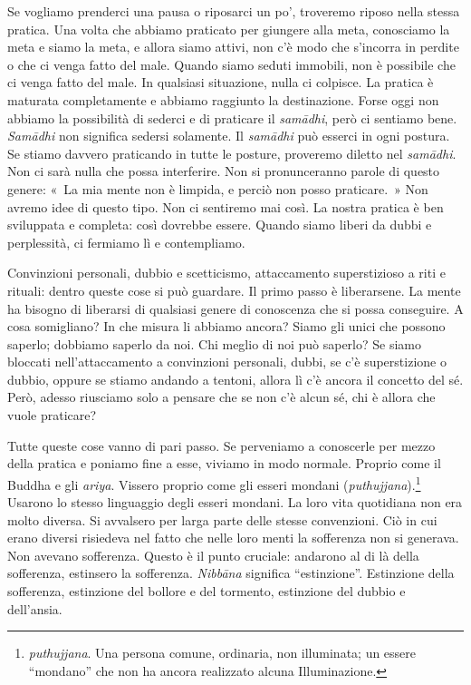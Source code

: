Se vogliamo prenderci una pausa o riposarci un po', troveremo riposo
nella stessa pratica. Una volta che abbiamo praticato per giungere alla
meta, conosciamo la meta e siamo la meta, e allora siamo attivi, non c'è
modo che s'incorra in perdite o che ci venga fatto del male. Quando
siamo seduti immobili, non è possibile che ci venga fatto del male. In
qualsiasi situazione, nulla ci colpisce. La pratica è maturata
completamente e abbiamo raggiunto la destinazione. Forse oggi non
abbiamo la possibilità di sederci e di praticare il \emph{samādhi}, però
ci sentiamo bene. \emph{Samādhi} non significa sedersi solamente. Il
\emph{samādhi} può esserci in ogni postura. Se stiamo davvero praticando
in tutte le posture, proveremo diletto nel \emph{samādhi}. Non ci sarà
nulla che possa interferire. Non si pronunceranno parole di questo
genere: «~La mia mente non è limpida, e perciò non posso praticare.~»
Non avremo idee di questo tipo. Non ci sentiremo mai così. La nostra
pratica è ben sviluppata e completa: così dovrebbe essere. Quando siamo
liberi da dubbi e perplessità, ci fermiamo lì e contempliamo.

Convinzioni personali, dubbio e scetticismo, attaccamento superstizioso
a riti e rituali: dentro queste cose si può guardare. Il primo passo è
liberarsene. La mente ha bisogno di liberarsi di qualsiasi genere di
conoscenza che si possa conseguire. A cosa somigliano? In che misura li
abbiamo ancora? Siamo gli unici che possono saperlo; dobbiamo saperlo da
noi. Chi meglio di noi può saperlo? Se siamo bloccati nell'attaccamento
a convinzioni personali, dubbi, se c'è superstizione o dubbio, oppure se
stiamo andando a tentoni, allora lì c'è ancora il concetto del sé. Però,
adesso riusciamo solo a pensare che se non c'è alcun sé, chi è allora
che vuole praticare?

Tutte queste cose vanno di pari passo. Se perveniamo a conoscerle per
mezzo della pratica e poniamo fine a esse, viviamo in modo normale.
Proprio come il Buddha e gli \emph{ariya}. Vissero proprio come gli
esseri mondani (\emph{puthujjana}).\footnote{\emph{puthujjana}. Una
  persona comune, ordinaria, non illuminata; un essere ``mondano'' che
  non ha ancora realizzato alcuna Illuminazione.} Usarono lo stesso
linguaggio degli esseri mondani. La loro vita quotidiana non era molto
diversa. Si avvalsero per larga parte delle stesse convenzioni. Ciò in
cui erano diversi risiedeva nel fatto che nelle loro menti la sofferenza
non si generava. Non avevano sofferenza. Questo è il punto cruciale:
andarono al di là della sofferenza, estinsero la sofferenza.
\emph{Nibbāna} significa ``estinzione''. Estinzione della sofferenza,
estinzione del bollore e del tormento, estinzione del dubbio e
dell'ansia.

